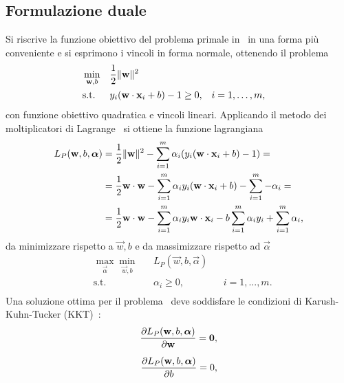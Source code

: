 \subsection{Formulazione duale}\label{subsec:hard_margin_dual}
Si riscrive la funzione obiettivo del problema primale in~ in una forma più conveniente e si esprimono i vincoli in forma normale, ottenendo il problema
\begin{equation}\label{eq:svc:hardmargin:primal_convenient}
\begin{aligned}
& \min_{\Vec{w},b}    && \frac{1}{2}\norm{\Vec{w}}^2 \\
& \textrm{s.t.} && y_i(\Vec{w}\cdot \Vec{x}_i + b) - 1 \geq 0, && i=1,\dots,m, \\
\end{aligned}
\end{equation}
con funzione obiettivo quadratica e vincoli lineari.
%
Applicando il metodo dei moltiplicatori di Lagrange~\cite{optimization_book} si ottiene la funzione lagrangiana
\begin{equation}
\label{eq:svc:hardmargin:lagrangian}
\begin{split}
L_P(\Vec{w},b, \vec{\alpha})  & = \frac{1}{2}\norm{\Vec{w}}^2 - \sum_{i=1}^{m} \alpha_i (y_i(\Vec{w}\cdot \Vec{x}_i +b) -1) =\\
        & = \frac{1}{2}\Vec{w} \cdot \Vec{w} - \sum_{i=1}^{m} \alpha_i y_i(\Vec{w}\cdot \Vec{x}_i +b) -  \sum_{i=1}^{m} - \alpha_i = \\
        & = \frac{1}{2}\Vec{w}\cdot\Vec{w} - \sum_{i=1}^{m} \alpha_i y_i \Vec{w}\cdot \Vec{x}_i - b \sum_{i=1}^{m} \alpha_i y_i + \sum_{i=1}^{m} \alpha_i,
\end{split}
\end{equation}
da minimizzare rispetto a $\Vec{w},b$ e da massimizzare rispetto ad $\Vec{\alpha}$ 
\begin{equation}
\label{eq:svc:hardmargin:max_min}
\begin{aligned}
& \max_{\vec{\alpha}} \min_{\Vec{w}, b} && L_P(\Vec{w},b, \Vec{\alpha}) \\
& \textrm{s.t.} && \alpha_i \geq 0, && i=1,..., m.\\
\end{aligned}
\end{equation}
%
%
Una soluzione ottima per il problema~ deve soddisfare le condizioni di Karush-Kuhn-Tucker (KKT)~\cite{svm_tutorial,optimization_book}:
\begin{align}
    \label{eq:svc:hardmargin:kkt1}
    \pd{L_P(\Vec{w},b,\vec{\alpha})}{\Vec{w}} = \Vec{0}, \\[2mm]
    \label{eq:svc:hardmargin:kkt2}
    \pd{L_P(\Vec{w},b,\vec{\alpha})}{b} = 0, 
\end{align}
